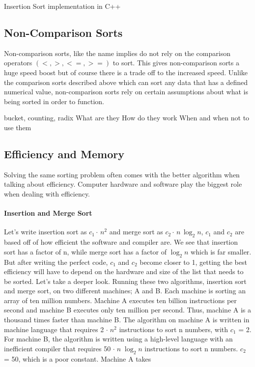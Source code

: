 \documentclass[12pt]{article}
\begin{document}
	
	\begin{Snippet}[h]
		\caption[Insertion Sort]{Insertion Sort implementation in C++}	
		
		\label{snip:ins}
	\end{Snippet}
	
	
	
	\subsection{Non-Comparison Sorts}
	
	Non-comparison sorts, like the name implies do not rely on the comparison operators $(<,>,<=,>=)$ to sort.
	This gives non-comparison sorts a huge speed boost but of course there is a trade off to the increased speed. 
	Unlike the comparison sorts described above which can sort any data that has a defined numerical value, non-comparison sorts rely on certain assumptions about what is being sorted in order to function.
	
	bucket, counting, radix
	What are they
	How do they work
	When and when not to use them
	
	
	\subsection{Efficiency and Memory}
	
	Solving the same sorting problem often comes with the better algorithm when talking about efficiency.
	Computer hardware and software play the biggest role when dealing with efficiency.
	
	\paragraph{Insertion and Merge Sort}
	
	Let’s write insertion sort as $c_1 \cdot\,n^2$ and merge sort as $c_2 \cdot\,n\,\log_2{n}$, $c_1$ and $c_2$ are based off of how efficient the software and compiler are.
	We see that insertion sort has a factor of n, while merge sort has a factor of $\log_2{n}$ which is far smaller.
	But after writing the perfect code, $c_1$ and $c_2$ become closer to 1, getting the best efficiency will have to depend on the hardware and size of the list that needs to be sorted.
	Let’s take a deeper look. Running these two algorithms, insertion sort and merge sort, on two different machines; A and B. Each machine is sorting an array of ten million numbers.
	Machine A executes ten billion instructions per second and machine B executes only ten million per second.
	Thus, machine A is a thousand times faster than machine B.
	The algorithm on machine A is written in machine language that requires 2 $\cdot\;n^2$ instructions to sort n numbers, with $c_1$ = 2.
	For machine B, the algorithm is written using a high-level language with an inefficient compiler that requires 50 $\cdot\;n\;\log_2{n}$ instructions to sort n numbers. $c_2$ = 50, which is a poor constant.
	Machine A takes
	
\end{document}
